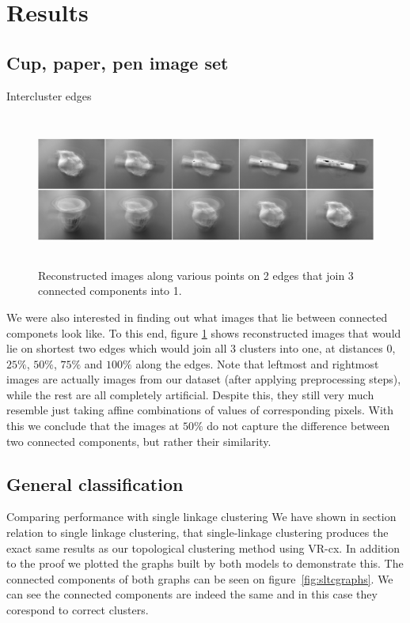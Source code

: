 \documentclass{article}
\newcommand{\enterProblemHeader}[1]{
}
\newcommand{\exitProblemHeader}[1]{
}
\newcounter{homeworkProblemCounter} %
\newcommand{\homeworkProblemName}{}
\newenvironment{homeworkProblem}[1][Problem \arabic{homeworkProblemCounter}]{ %
\stepcounter{homeworkProblemCounter} %
\renewcommand{\homeworkProblemName}{#1} %
\section{\homeworkProblemName} %
\enterProblemHeader{\homeworkProblemName} %
}{
\exitProblemHeader{\homeworkProblemName} %
}
\newcommand{\homeworkSectionName}{}
\newenvironment{homeworkSection}[1]{ %
\renewcommand{\homeworkSectionName}{#1} %
\subsection{\homeworkSectionName} %
\enterProblemHeader{\homeworkProblemName\ [\homeworkSectionName]} %
}{
\enterProblemHeader{\homeworkProblemName} %
}
\begin{document}
\begin{homeworkProblem}[Results]
\begin{homeworkSection}{Cup, paper, pen image set}
\begin{paragraph}{Intercluster edges}
\begin{figure}[h]
    \centering
    \includegraphics[height=5cm]{img/edges}
    \caption{Reconstructed images along various points on 2 edges that join 3 connected components into 1.}
    \label{fig:edges}
\end{figure}
We were also interested in finding out what images that lie between connected componets look like. To this end, figure \ref{fig:edges} shows reconstructed images that would lie on shortest two edges which would join all 3 clusters into one, at distances $0$, $25\%$, $50\%$, $75\%$ and $100\%$ along the edges. Note that leftmost and rightmost images are actually images from our dataset (after applying preprocessing steps), while the rest are all completely artificial. Despite this, they still very much resemble just taking affine combinations of values of corresponding pixels. With this we conclude that the images at $50\%$ do not capture the difference between two connected components, but rather their similarity.

\end{paragraph}

\end{homeworkSection}


\begin{homeworkSection}{General classification}
  
\begin{paragraph}{Comparing performance with single linkage clustering}
We have shown in section relation to single linkage clustering, that single-linkage clustering produces the exact same results as our topological clustering method using VR-cx. In addition to the proof we plotted the graphs built by both models to demonstrate this. The connected components of both graphs can be seen on figure~\ref{fig:sltcgraphs}. We can see the connected components are indeed the same and in this case they corespond to correct clusters.


\end{paragraph}
\end{homeworkSection}
\end{homeworkProblem}
\end{document}
